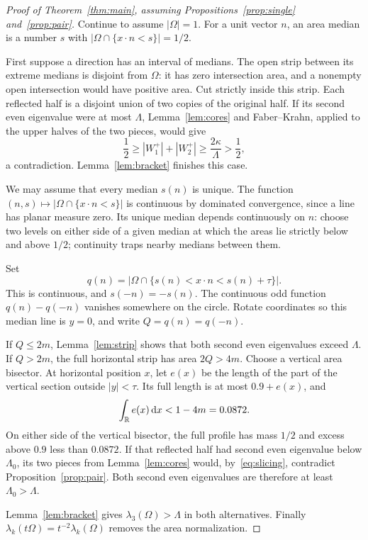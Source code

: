 \begin{proof}[Proof of Theorem~\ref{thm:main}, assuming Propositions~\ref{prop:single} and~\ref{prop:pair}]
Continue to assume $|\Omega|=1$. For a unit vector $n$, an area median is a number $s$ with $|\Omega\cap\{x\cdot n<s\}|=1/2$.

First suppose a direction has an interval of medians. The open strip between its extreme medians is disjoint from $\Omega$: it has zero intersection area, and a nonempty open intersection would have positive area. Cut strictly inside this strip. Each reflected half is a disjoint union of two copies of the original half. If its second even eigenvalue were at most $\Lambda$, Lemma~\ref{lem:cores} and Faber--Krahn, applied to the upper halves of the two pieces, would give
\[
 \frac12\ge |W_1^+|+|W_2^+|\ge\frac{2\kappa}{\Lambda}>\frac12,
\]
a contradiction. Lemma~\ref{lem:bracket} finishes this case.

We may assume that every median $s(n)$ is unique. The function $(n,s)\mapsto|\Omega\cap\{x\cdot n<s\}|$ is continuous by dominated convergence, since a line has planar measure zero. Its unique median depends continuously on $n$: choose two levels on either side of a given median at which the areas lie strictly below and above $1/2$; continuity traps nearby medians between them.

Set
\[
 q(n)=|\Omega\cap\{s(n)<x\cdot n<s(n)+\tau\}|.
\]
This is continuous, and $s(-n)=-s(n)$. The continuous odd function $q(n)-q(-n)$ vanishes somewhere on the circle. Rotate coordinates so this median line is $y=0$, and write $Q=q(n)=q(-n)$.

If $Q\le2m$, Lemma~\ref{lem:strip} shows that both second even eigenvalues exceed $\Lambda$. If $Q>2m$, the full horizontal strip has area $2Q>4m$. Choose a vertical area bisector. At horizontal position $x$, let $e(x)$ be the length of the part of the vertical section outside $|y|<\tau$. Its full length is at most $0.9+e(x)$, and
\[
 \int_\mathbb R e(x)\,\mathrm d x<1-4m=0.0872.
\]
On either side of the vertical bisector, the full profile has mass $1/2$ and excess above $0.9$ less than $0.0872$. If that reflected half had second even eigenvalue below $\Lambda_0$, its two pieces from Lemma~\ref{lem:cores} would, by~\eqref{eq:slicing}, contradict Proposition~\ref{prop:pair}. Both second even eigenvalues are therefore at least $\Lambda_0>\Lambda$.

Lemma~\ref{lem:bracket} gives $\lambda_3(\Omega)>\Lambda$ in both alternatives. Finally $\lambda_k(t\Omega)=t^{-2}\lambda_k(\Omega)$ removes the area normalization.
\end{proof}
